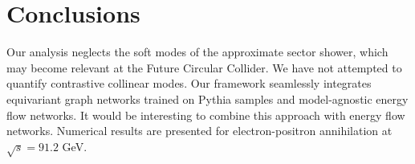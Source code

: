 \section{Conclusions}\label{sec:conclusions}

Our analysis neglects the soft modes of the approximate sector shower,
which may become relevant at the Future Circular Collider. We have not
attempted to quantify contrastive collinear modes. Our framework
seamlessly integrates equivariant graph networks trained on Pythia
samples and model-agnostic energy flow networks. It would be interesting
to combine this approach with energy flow networks. Numerical results
are presented for electron-positron annihilation at $\sqrt{s} = 91.2$
GeV.

